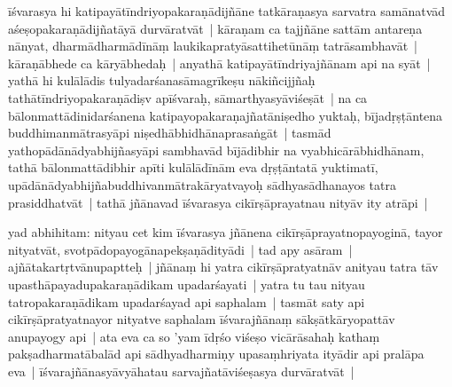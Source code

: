 \documentclass[article,12pt,a4paper]{memoir}%
\newcounter{parCount}
\begin{document}
	  
	  \pstart \leavevmode%
	\label{thakur75-35.3}īśvarasya hi katipayātīndriyopakaraṇādijñāne tatkāraṇasya sarvatra samānatvād aśeṣopakaraṇādijñatāyā durvāratvāt | kāraṇam ca tajjñāne sattām antareṇa nānyat, dharmādharmādīnāṃ laukikapratyāsattihetūnāṃ tatrāsambhavāt | kāraṇābhede ca kāryābhedaḥ | anyathā katipayātīndriyajñānam api na syāt | yathā hi \label{ratnakīrtinibandhāvali__36r1PF7IMWUFC5S10GC5G797R9K}kulālādis\label{ratnakīrtinibandhāvali__36r1PF7IMWTROD9VEEQNOUKG7MN} tulyadarśanasāmagrīkeṣu nākiñcij\label{ratnakīrtinibandhāvali__36r1PF7IMWT51K8YNUUTZQTQ86H}jñaḥ\label{ratnakīrtinibandhāvali__36r1PF7IMWSHSBW8CCLYGRITU90} tathātīndriyopakaraṇādiṣv apīśvaraḥ, sāmarthyasyāviśeṣāt | na ca bālonmattādinidarśanena katipayopakaraṇajñatāniṣedho yuktaḥ, bījadṛṣṭāntena buddhimanmātrasyāpi niṣedhābhidhānaprasaṅgāt | tasmād yathopādānādyabhijñasyāpi sambhavād bījādibhir na vyabhicārābhidhānam, tathā bālonmattādibhir apīti kulālādīnām eva dṛṣṭāntatā yuktimatī, upādānādyabhijñabuddhivanmātrakāryatvayoḥ sādhyasādhanayos tatra prasiddhatvāt | tathā jñānavad īśvarasya cikīrṣāprayatnau nityāv ity atrāpi |
	{}
	\pend%
      

	  
	  \pstart \leavevmode%
	\label{thakur75-35.14}yad abhihitam: nityau cet kim īśvarasya jñānena cikīrṣāprayatnopayoginā, tayor nityatvāt, svotpādopayogānapekṣaṇādityādi | tad apy asāram | ajñātakartṛtvānupaptteḥ | jñānaṃ hi yatra cikīrṣāpratyatnāv anityau tatra tāv upasthāpayadupakaraṇādikam upadarśayati | yatra tu tau nityau tatropakaraṇādikam upadarśayad api saphalam | tasmāt saty api cikīrṣāpratyatnayor nityatve saphalam īśvarajñānaṃ sākṣātkāryopattāv anupayogy api | ata eva ca so 'yam īdṛśo viśeṣo vicārāsahaḥ kathaṃ pakṣadharmatābalād api sādhyadharmiṇy upasaṃhriyata ityādir api pralāpa eva | īśvarajñānasyāvyāhatau sarvajñatāviśeṣasya durvāratvāt |
	{}
	\pend%
      
\end{document}
